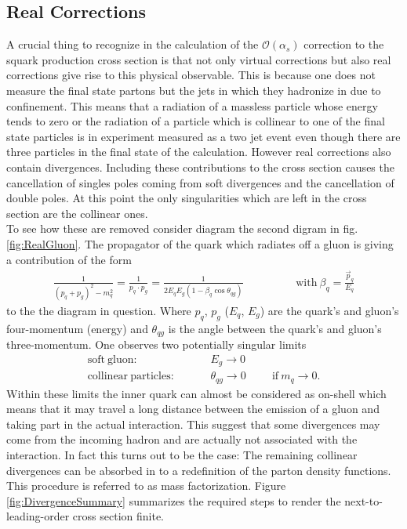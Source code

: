 \subsection{Real Corrections}
A crucial thing to recognize in the calculation of the $\mathcal{O}(\alpha_s)$ correction to the squark production cross section is that not only virtual corrections but also real corrections give rise to this physical observable. This is because one does not measure the final state partons but the jets in which they hadronize in due to confinement. This means that a radiation of a massless particle whose energy tends to zero or the radiation of a  particle which is collinear to one of the final state particles is in experiment measured as a two jet event even though there are three particles in the final state of the calculation. However real corrections also contain divergences. Including these contributions to the cross section causes the cancellation of singles poles coming from soft divergences and the cancellation of double poles. At this point the only singularities which are left in the cross section are the collinear ones.\\
To see how these are removed consider diagram the second digram in fig. \ref{fig:RealGluon}. The propagator of the quark which radiates off a gluon is giving a contribution of the form
\begin{align}
\frac{1}{(p_q + p_g)^2 - m_q^2} = \frac{1}{p_q \cdot p_g} = \frac{1}{2E_qE_g(1-\beta_q \cos \theta_{qg})} \hspace{2cm} \mathrm{with}\ \beta_q = \frac{\vec{p}_q}{E_q}
\end{align}
to the the diagram in question. Where $p_q$, $p_g$ ($E_q$, $E_g$) are the quark's and gluon's four-momentum (energy) and $\theta_{qg}$ is the angle between the quark's and gluon's three-momentum. One observes two potentially singular limits
\begin{align}
\mathrm{soft\ gluon:}& \hspace{1cm} E_g \to 0\\
\mathrm{collinear\ particles:}& \hspace{1cm} \theta_{qg} \to 0 \hspace{1cm} \mathrm{if}\ m_q \to 0.
\end{align}
Within these limits the inner quark can almost be considered as on-shell which means that it may travel a long distance between the emission of a gluon and taking part in the actual interaction. This suggest that some divergences may come from the incoming hadron and are actually not associated with the interaction. In fact this turns out to be the case: The remaining collinear divergences can be absorbed in to a redefinition of the parton density functions. This procedure is referred to as mass factorization. Figure \ref{fig:DivergenceSummary} summarizes the required steps to render the next-to-leading-order cross section finite.\\

